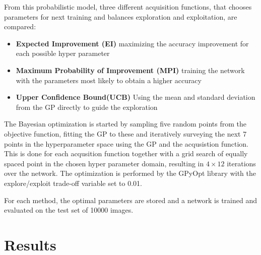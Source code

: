 \documentclass[12pt,fleqn]{article}
\begin{document}
\begin{multicols}{2}
From this probabilistic model, three different acquisition functions, that chooses parameters for next training and balances exploration and exploitation, are compared:

\begin{itemize}
	\item \textbf{Expected Improvement (EI)} maximizing the accuracy improvement for each possible hyper parameter
	\item \textbf{Maximum Probability of Improvement (MPI)} training the network with the parameters most likely to obtain a higher accuracy
	\item \textbf{Upper Confidence Bound(UCB)} Using the mean and standard deviation from the GP directly to guide the exploration
\end{itemize}
The Bayesian optimization is started by sampling five random points from the objective function, fitting the GP to these and iteratively surveying the next 7 points in the hyperparameter space using the GP and the acqusistion function. This is done for each acqusition function together with a grid search of equally spaced point in the chosen hyper parameter domain, resulting in \(4\times12\) iterations over the network. The optimization is performed by the GPyOpt library \cite{gpyopt} with the  explore/exploit trade-off variable set to 0.01.

For each method, the optimal parameters are stored and a network is trained and evaluated on the test set of 10000 images.

\end{multicols}

\section{Results}
\end{document}
